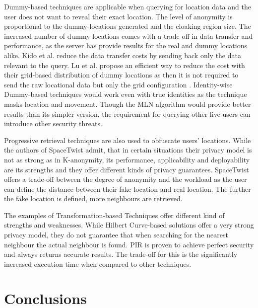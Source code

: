 \documentclass[english]{tktltiki2}
\theoremstyle{definition}
\theoremstyle{remark}
\begin{document}
Dummy-based techniques are applicable when querying for location data and the user does not want to reveal their exact location. The level of anonymity is proportional to the dummy-locations generated and the cloaking region size. The increased number of dummy locations comes with a trade-off in data transfer and performance, as the server has provide results for the real and dummy locations alike. Kido et al. reduce the data transfer costs by sending back only the data relevant to the query\cite{Kido2005}. Lu et al. propose an efficient way to reduce the cost with their grid-based distribution of dummy locations as then it is not required to send the raw locational data but only the grid configuration \cite{Lu2008}. Identity-wise Dummy-based techniques would work even with true identities as the technique masks location and movement. Though the MLN algorithm would provide better results than its simpler version, the requirement for querying other live users can introduce other security threats.\par
Progressive retrieval techniques are also used to obfuscate users' locations. While the authors of SpaceTwist\cite{SpaceTwist} admit, that in certain situations their privacy model is not as strong as in K-anonymity, its performance, applicability and deployability are its strengths and they offer different kinds of privacy guarantees. SpaceTwist offers a trade-off between the degree of anonymity and the workload as the user can define the distance between their fake location and real location. The further the fake location is defined, more neighbours are retrieved. \par 
The examples of Transformation-based Techniques offer different kind of strengths and weaknesses. While Hilbert Curve-based solutions \cite{Hilbert, Um2010} offer a very strong privacy model, they do not guarantee that when searching for the nearest neighbour the actual neighbour is found. PIR \cite{Ghinita2008} is proven to achieve perfect security and always returns accurate results. The trade-off for this is the significantly increased execution time when compared to other techniques.
 

\section{Conclusions}
\end{document}
